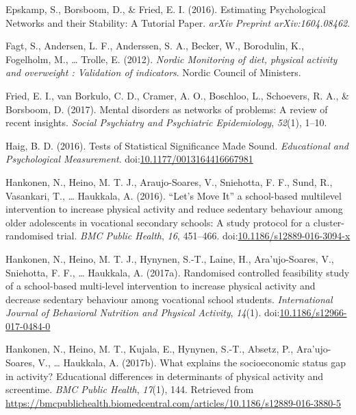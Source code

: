 \documentclass[english,floatsintext,]{apa6}
\theoremstyle{definition}
\theoremstyle{definition}
\theoremstyle{definition}
\theoremstyle{remark}
\begin{document}
\hypertarget{ref-epskampEstimatingPsychologicalNetworks2016}{}
Epskamp, S., Borsboom, D., \& Fried, E. I. (2016). Estimating
Psychological Networks and their Stability: A Tutorial Paper.
\emph{arXiv Preprint arXiv:1604.08462}.

\hypertarget{ref-fagtNordicMonitoringDiet2012}{}
Fagt, S., Andersen, L. F., Anderssen, S. A., Becker, W., Borodulin, K.,
Fogelholm, M., \ldots{} Trolle, E. (2012). \emph{Nordic Monitoring of
diet, physical activity and overweight : Validation of indicators}.
Nordic Council of Ministers.

\hypertarget{ref-friedMentalDisordersNetworks2017}{}
Fried, E. I., van Borkulo, C. D., Cramer, A. O., Boschloo, L.,
Schoevers, R. A., \& Borsboom, D. (2017). Mental disorders as networks
of problems: A review of recent insights. \emph{Social Psychiatry and
Psychiatric Epidemiology}, \emph{52}(1), 1--10.

\hypertarget{ref-haigTestsStatisticalSignificance2016}{}
Haig, B. D. (2016). Tests of Statistical Significance Made Sound.
\emph{Educational and Psychological Measurement}.
doi:\href{https://doi.org/10.1177/0013164416667981}{10.1177/0013164416667981}

\hypertarget{ref-hankonenLetMoveIt2016}{}
Hankonen, N., Heino, M. T. J., Araujo-Soares, V., Sniehotta, F. F.,
Sund, R., Vasankari, T., \ldots{} Haukkala, A. (2016). ``Let's Move It''
a school-based multilevel intervention to increase physical activity and
reduce sedentary behaviour among older adolescents in vocational
secondary schools: A study protocol for a cluster-randomised trial.
\emph{BMC Public Health}, \emph{16}, 451--466.
doi:\href{https://doi.org/10.1186/s12889-016-3094-x}{10.1186/s12889-016-3094-x}

\hypertarget{ref-hankonenRandomisedControlledFeasibility2017}{}
Hankonen, N., Heino, M. T. J., Hynynen, S.-T., Laine, H.,
Ara\a'ujo-Soares, V., Sniehotta, F. F., \ldots{} Haukkala, A. (2017a).
Randomised controlled feasibility study of a school-based multi-level
intervention to increase physical activity and decrease sedentary
behaviour among vocational school students. \emph{International Journal
of Behavioral Nutrition and Physical Activity}, \emph{14}(1).
doi:\href{https://doi.org/10.1186/s12966-017-0484-0}{10.1186/s12966-017-0484-0}

\hypertarget{ref-hankonenWhatExplainsSocioeconomic2017}{}
Hankonen, N., Heino, M. T., Kujala, E., Hynynen, S.-T., Absetz, P.,
Ara\a'ujo-Soares, V., \ldots{} Haukkala, A. (2017b). What explains the
socioeconomic status gap in activity? Educational differences in
determinants of physical activity and screentime. \emph{BMC Public
Health}, \emph{17}(1), 144. Retrieved from
\url{https://bmcpublichealth.biomedcentral.com/articles/10.1186/s12889-016-3880-5}
\end{document}
